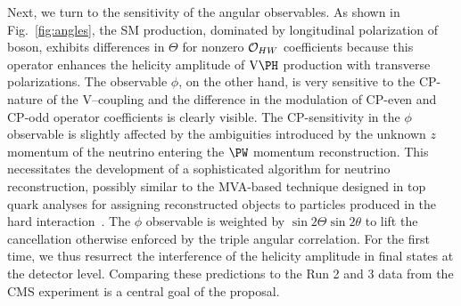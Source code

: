 \documentclass[a4paper,11pt]{article}
\renewcommand{\PV}{{{{V}}}\xspace}
\begin{document}
Next, we turn to the sensitivity of the angular observables. As shown in Fig.~\ref{fig:angles}, 
the SM production, dominated by longitudinal polarization of \PW boson, exhibits differences in $\Theta$ for nonzero ${\cal O}_{HW}$  coefficients because this operator  enhances the helicity amplitude of $\textrm{\PV}\PH$ production with transverse polarizations.%
The observable $\phi$, on the other hand, is very sensitive to the CP-nature of the \PV--\PH coupling and the difference in the modulation of CP-even and CP-odd operator coefficients is clearly visible.  
The CP-sensitivity in the $\phi$ observable is slightly affected by the ambiguities introduced by the unknown $z$ momentum of the neutrino entering the $\PW$ momentum reconstruction. 
This necessitates the development of a sophisticated algorithm for neutrino reconstruction, possibly similar to the MVA-based technique designed in top quark analyses for assigning reconstructed objects to particles produced in the hard interaction~\cite{CMS:2019esx}.
The $\phi$ observable is weighted by $\sin2\Theta\sin2\theta$ to lift the cancellation otherwise enforced by the triple angular correlation. 
For the first time, we thus resurrect the interference of the helicity amplitude in \PH final states at the detector level. 
Comparing these predictions to the Run 2 and 3 data from the CMS experiment is a central goal of the proposal.
\end{document}
